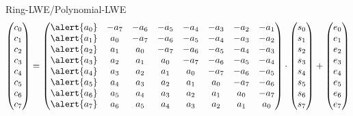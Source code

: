 \documentclass[xcolor=table,10pt,aspectratio=169]{beamer}
\begin{document}
\begin{frame}[label={sec:orgb52b381}]{Ring-LWE/Polynomial-LWE}
\[
\begin{pmatrix}c_{0} \\ c_{1} \\ c_{2} \\ c_{3} \\ c_{4} \\ c_{5} \\ c_{6} \\ c_{7}\end{pmatrix} = 
\begin{pmatrix}
\alert{a_{0}} & -a_{7} & -a_{6} & -a_{5} & -a_{4} & -a_{3} & -a_{2} & -a_{1} \\
\alert{a_{1}} & a_{0} & -a_{7} & -a_{6} & -a_{5} & -a_{4} & -a_{3} & -a_{2} \\
\alert{a_{2}} & a_{1} & a_{0} & -a_{7} & -a_{6} & -a_{5} & -a_{4} & -a_{3} \\
\alert{a_{3}} & a_{2} & a_{1} & a_{0} & -a_{7} & -a_{6} & -a_{5} & -a_{4} \\
\alert{a_{4}} & a_{3} & a_{2} & a_{1} & a_{0} & -a_{7} & -a_{6} & -a_{5} \\
\alert{a_{5}} & a_{4} & a_{3} & a_{2} & a_{1} & a_{0} & -a_{7} & -a_{6} \\
\alert{a_{6}} & a_{5} & a_{4} & a_{3} & a_{2} & a_{1} & a_{0} & -a_{7} \\
\alert{a_{7}} & a_{6} & a_{5} & a_{4} & a_{3} & a_{2} & a_{1} & a_{0}
\end{pmatrix}\cdot
\begin{pmatrix}s_{0} \\ s_{1} \\ s_{2} \\ s_{3} \\ s_{4} \\ s_{5} \\ s_{6} \\ s_{7}\end{pmatrix} +
\begin{pmatrix}e_{0} \\ e_{1} \\ e_{2} \\ e_{3} \\ e_{4} \\ e_{5} \\ e_{6} \\ e_{7}\end{pmatrix}
\]
\end{frame}
\end{document}
